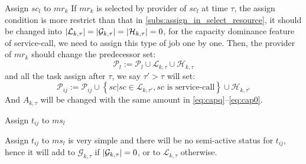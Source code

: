 \begin{asparaenum}
\item Assign $sc_l$ to $mr_k$
If $mr_k$ is selected by provider of $sc_l$ at time $\tau$, the assign condition is more restrict than that in \autoref{subs:assign_in_select_resource}, it should be changed into $\left|\mathcal{L}_{k,\tau}\right| = \left|\mathcal{G}_{k,\tau}\right| = \left|\mathcal{H}_{k,\tau}\right| = 0$, for the capacity dominance feature of service-call, we need to assign this type of job one by one. Then, the provider of $mr_k$ should change the predecessor set:
\begin{equation}
	\mathcal{P}_l := \mathcal{P}_l\cup \mathcal{L}_{k,\tau} \cup \mathcal{H}_{k,\tau}
\end{equation}
and all the task assign after $\tau$, we say $\tau'>\tau$ will set:
\begin{equation}
	\mathcal{P}_{ij} := \mathcal{P}_{ij}\cup \left\{ sc| sc\in\mathcal{L}_{k,\tau'},sc \text{ is service-call} \right\} \cup \mathcal{H}_{k,\tau'}
\end{equation}
And $A_{k,\tau}$ will be changed with the same amount in \autoref{eq:capq}--\ref{eq:cap0}.
\item Assign $t_{ij}$ to $ms_l$
\end{asparaenum}
Assign $t_{ij}$ to $ms_l$ is very simple and there will be no semi-active status for $t_{ij}$, hence it will add to $\mathcal{G}_{k,\tau}$ if $\left|\mathcal{G}_{k,\tau}\right|=0$, or to $\mathcal{L}_{k,\tau}$ otherwise.


